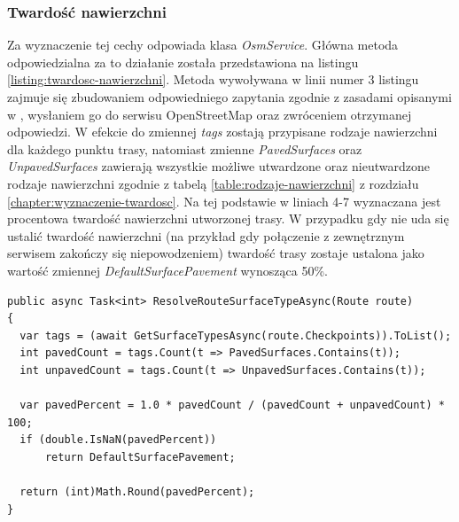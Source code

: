 \subsubsection{Twardość nawierzchni}
Za wyznaczenie tej cechy odpowiada klasa \textit{OsmService}. Główna metoda odpowiedzialna za to działanie została przedstawiona na listingu \ref{listing:twardosc-nawierzchni}. Metoda wywoływana w linii numer 3 listingu zajmuje się zbudowaniem odpowiedniego zapytania zgodnie z zasadami opisanymi w \cite{osm-docs-wiki}, wysłaniem go do serwisu OpenStreetMap \cite{osm} oraz zwróceniem otrzymanej odpowiedzi. W efekcie do zmiennej \textit{tags} zostają przypisane rodzaje nawierzchni dla każdego punktu trasy, natomiast zmienne \textit{PavedSurfaces} oraz \textit{UnpavedSurfaces} zawierają wszystkie możliwe utwardzone oraz nieutwardzone rodzaje nawierzchni zgodnie z tabelą \ref{table:rodzaje-nawierzchni} z rozdziału \ref{chapter:wyznaczenie-twardosc}. Na tej podstawie w liniach 4-7 wyznaczana jest procentowa twardość nawierzchni utworzonej trasy. 
W przypadku gdy nie uda się ustalić twardość nawierzchni (na przykład gdy połączenie z zewnętrznym serwisem zakończy się niepowodzeniem) twardość trasy zostaje ustalona jako wartość zmiennej \textit{DefaultSurfacePavement} wynosząca 50\%.
\begin{lstlisting}[caption={Wyznaczenie twardości nawierzchni},label=listing:twardosc-nawierzchni]
public async Task<int> ResolveRouteSurfaceTypeAsync(Route route)
{
  var tags = (await GetSurfaceTypesAsync(route.Checkpoints)).ToList();
  int pavedCount = tags.Count(t => PavedSurfaces.Contains(t));
  int unpavedCount = tags.Count(t => UnpavedSurfaces.Contains(t));

  var pavedPercent = 1.0 * pavedCount / (pavedCount + unpavedCount) * 100;
  if (double.IsNaN(pavedPercent))
      return DefaultSurfacePavement;

  return (int)Math.Round(pavedPercent);
}
\end{lstlisting}

